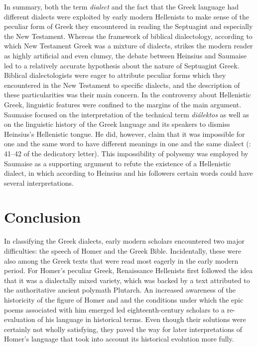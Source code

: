 In summary, both the term \textit{dialect} and the fact that the Greek language had different dialects were exploited by early modern Hellenists to make sense of the peculiar form of Greek they encountered in reading the Septuagint and especially the New Testament. Whereas the framework of biblical dialectology, according to which New Testament Greek was a mixture of dialects, strikes the modern reader as highly artificial and even clumsy, the debate between Heinsius and Saumaise led to a relatively accurate hypothesis about the nature of Septuagint Greek. Biblical dialectologists were eager to attribute peculiar forms which they encountered in the New Testament to specific dialects, and the description of these particularities was their main concern. In the controversy about Hellenistic Greek, linguistic features were confined to the margins of the main argument. Saumaise focused on the interpretation of the technical term \textit{diálektos} as well as on the linguistic history of the Greek language and its speakers to dismiss Heinsius’s Hellenistic tongue. He did, however, claim that it was impossible for one and the same word to have different meanings in one and the same dialect (\citealt{Saumaise1643a}: 41–42 of the dedicatory letter). This impossibility of polysemy was employed by Saumaise as a supporting argument to refute the existence of a Hellenistic dialect, in which according to Heinsius and his followers certain words could have several interpretations.

\section{Conclusion}\label{sec:4.7}

In classifying the Greek dialects, early modern scholars encountered two major difficulties: the speech of Homer and the Greek Bible. Incidentally, these were also among the Greek texts that were read most eagerly in the early modern period. For Homer’s peculiar Greek, Renaissance Hellenists first followed the idea that it was a dialectally mixed variety, which was backed by a text attributed to the authoritative ancient polymath Plutarch. An increased awareness of the historicity of the figure of Homer and and the conditions under which the epic poems associated with him emerged led eighteenth-century scholars to a re-evaluation of his language in historical terms. Even though their solutions were certainly not wholly satisfying, they paved the way for later interpretations of Homer’s language that took into account its historical evolution more fully.

